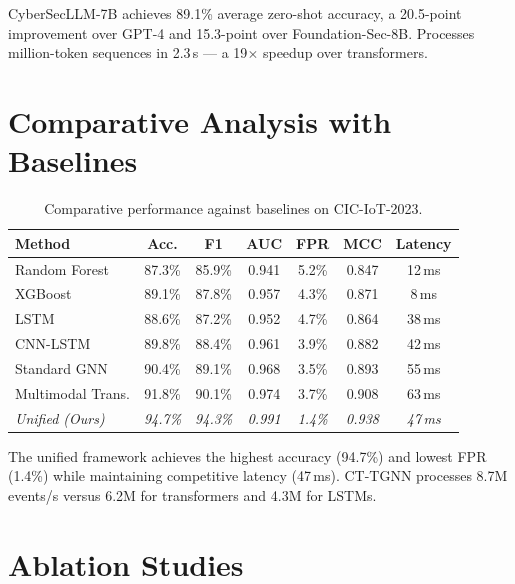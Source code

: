 CyberSecLLM-7B achieves 89.1\% average zero-shot accuracy, a 20.5-point improvement over GPT-4 and 15.3-point over Foundation-Sec-8B. Processes million-token sequences in 2.3\,s --- a 19$\times$ speedup over transformers.


\section{Comparative Analysis with Baselines}
\label{sec:comparative}

\begin{table}[htbp]
\centering
\caption{Comparative performance against baselines on CIC-IoT-2023.}
\label{tab:comparative}
\begin{tabular}{lcccccc}
\toprule
Method & Acc. & F1 & AUC & FPR & MCC & Latency \\
\midrule
Random Forest      & 87.3\% & 85.9\% & 0.941 & 5.2\% & 0.847 & 12\,ms \\
XGBoost            & 89.1\% & 87.8\% & 0.957 & 4.3\% & 0.871 & 8\,ms \\
LSTM               & 88.6\% & 87.2\% & 0.952 & 4.7\% & 0.864 & 38\,ms \\
CNN-LSTM           & 89.8\% & 88.4\% & 0.961 & 3.9\% & 0.882 & 42\,ms \\
Standard GNN       & 90.4\% & 89.1\% & 0.968 & 3.5\% & 0.893 & 55\,ms \\
Multimodal Trans.  & 91.8\% & 90.1\% & 0.974 & 3.7\% & 0.908 & 63\,ms \\
\textit{Unified (Ours)}   & \textit{94.7\%} & \textit{94.3\%} & \textit{0.991} & \textit{1.4\%} & \textit{0.938} & \textit{47\,ms} \\
\bottomrule
\end{tabular}
\end{table}

The unified framework achieves the highest accuracy (94.7\%) and lowest FPR (1.4\%) while maintaining competitive latency (47\,ms). CT-TGNN processes 8.7M events/s versus 6.2M for transformers and 4.3M for LSTMs.


\section{Ablation Studies}
\label{sec:ablation}

